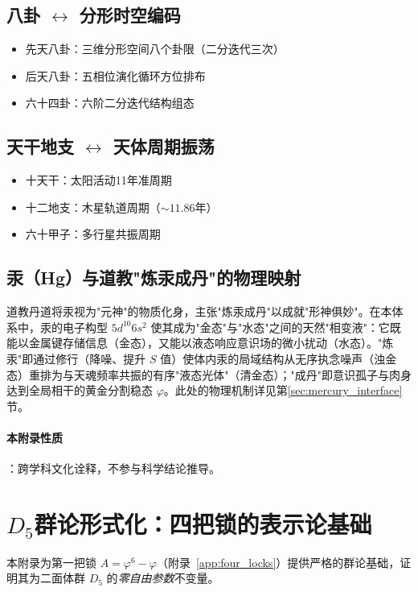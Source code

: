 \documentclass[12pt,a4paper,twocolumn]{article}
\renewcommand{\phi}{\varphi}
\begin{document}
\subsection{八卦 $\leftrightarrow$ 分形时空编码}
\begin{itemize}
\item 先天八卦：三维分形空间八个卦限（二分迭代三次）
\item 后天八卦：五相位演化循环方位排布
\item 六十四卦：六阶二分迭代结构组态
\end{itemize}

\subsection{天干地支 $\leftrightarrow$ 天体周期振荡}
\begin{itemize}
\item 十天干：太阳活动11年准周期
\item 十二地支：木星轨道周期（$\sim11.86$年）
\item 六十甲子：多行星共振周期
\end{itemize}

\subsection{汞（Hg）与道教"炼汞成丹"的物理映射}
道教丹道将汞视为"元神"的物质化身，主张"炼汞成丹"以成就"形神俱妙"。在本体系中，汞的电子构型 $5d^{10}6s^2$ 使其成为"金态"与"水态"之间的天然"相变液"：它既能以金属键存储信息（金态），又能以液态响应意识场的微小扰动（水态）。"炼汞"即通过修行（降噪、提升 $S$ 值）使体内汞的局域结构从无序执念噪声（浊金态）重排为与天魂频率共振的有序"液态光体"（清金态）；"成丹"即意识孤子与肉身达到全局相干的黄金分割稳态 $\phi$。此处的物理机制详见第\ref{sec:mercury_interface}节。

\paragraph{本附录性质}：跨学科文化诠释，不参与科学结论推导。


\section{$D_5$群论形式化：四把锁的表示论基础}
\label{app:d5_group}

本附录为第一把锁 $A = \phi^6 - \phi$（附录~\ref{app:four_locks}）提供严格的群论基础，证明其为二面体群 $D_5$ 的\emph{零自由参数}不变量。
\end{document}
